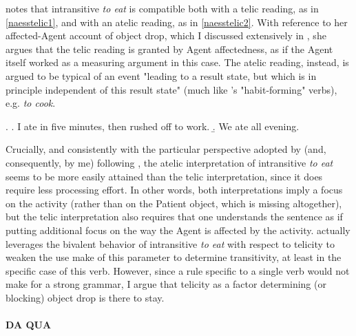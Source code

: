 \textcite[78-79]{Naess2007} notes that intransitive \textit{to eat} is compatible both with a telic reading, as in \ref{naesstelic1}, and with an atelic reading, as in \ref{naesstelic2}. With reference to her affected-Agent account of object drop, which I discussed extensively in , she argues that the telic reading is granted by Agent affectedness, as if the Agent itself worked as a measuring argument in this case. The atelic reading, instead, is argued to be typical of an event "leading to a result state, but which is in principle independent of this result state" (much like \textcite{Vendler1957}'s "habit-forming" verbs), e.g. \textit{to cook}.

\ex. \label{naesstelic} \a. \label{naesstelic1} I ate in five minutes, then rushed off to work.
\b. \label{naesstelic2} We ate all evening.

Crucially, and consistently with the particular perspective adopted by \textcite{Medina2007} (and, consequently, by me) following \textcite{Olsen1997}, the atelic interpretation of intransitive \textit{to eat} seems to be more easily attained than the telic interpretation, since it does require less processing effort. In other words, both interpretations imply a focus on the activity (rather than on the Patient object, which is missing altogether), but the telic interpretation also requires that one understands the sentence as if putting additional focus on the way the Agent is affected by the activity. \textcite[79]{Naess2007} actually leverages the bivalent behavior of intransitive \textit{to eat} with respect to telicity to weaken the use \textcite{HopperThompson1980} make of this parameter to determine transitivity, at least in the specific case of this verb. However, since a rule specific to a single verb would not make for a strong grammar, I argue that telicity as a factor determining (or blocking) object drop is there to stay.


\paragraph{DA QUA}


